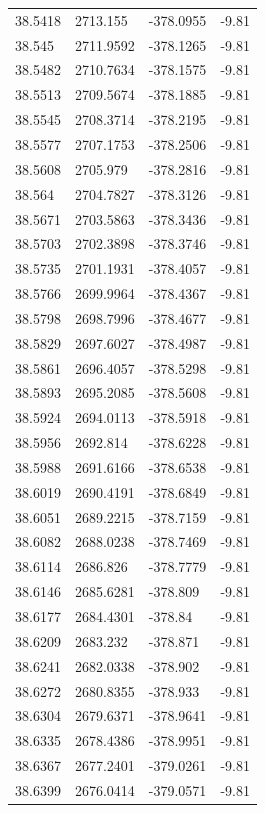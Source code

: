 \begin{table}[H]
\begin{tabular}{llll}
38.5418 & 2713.155 & -378.0955 & -9.81 \\
38.545 & 2711.9592 & -378.1265 & -9.81 \\
38.5482 & 2710.7634 & -378.1575 & -9.81 \\
38.5513 & 2709.5674 & -378.1885 & -9.81 \\
38.5545 & 2708.3714 & -378.2195 & -9.81 \\
38.5577 & 2707.1753 & -378.2506 & -9.81 \\
38.5608 & 2705.979 & -378.2816 & -9.81 \\
38.564 & 2704.7827 & -378.3126 & -9.81 \\
38.5671 & 2703.5863 & -378.3436 & -9.81 \\
38.5703 & 2702.3898 & -378.3746 & -9.81 \\
38.5735 & 2701.1931 & -378.4057 & -9.81 \\
38.5766 & 2699.9964 & -378.4367 & -9.81 \\
38.5798 & 2698.7996 & -378.4677 & -9.81 \\
38.5829 & 2697.6027 & -378.4987 & -9.81 \\
38.5861 & 2696.4057 & -378.5298 & -9.81 \\
38.5893 & 2695.2085 & -378.5608 & -9.81 \\
38.5924 & 2694.0113 & -378.5918 & -9.81 \\
38.5956 & 2692.814 & -378.6228 & -9.81 \\
38.5988 & 2691.6166 & -378.6538 & -9.81 \\
38.6019 & 2690.4191 & -378.6849 & -9.81 \\
38.6051 & 2689.2215 & -378.7159 & -9.81 \\
38.6082 & 2688.0238 & -378.7469 & -9.81 \\
38.6114 & 2686.826 & -378.7779 & -9.81 \\
38.6146 & 2685.6281 & -378.809 & -9.81 \\
38.6177 & 2684.4301 & -378.84 & -9.81 \\
38.6209 & 2683.232 & -378.871 & -9.81 \\
38.6241 & 2682.0338 & -378.902 & -9.81 \\
38.6272 & 2680.8355 & -378.933 & -9.81 \\
38.6304 & 2679.6371 & -378.9641 & -9.81 \\
38.6335 & 2678.4386 & -378.9951 & -9.81 \\
38.6367 & 2677.2401 & -379.0261 & -9.81 \\
38.6399 & 2676.0414 & -379.0571 & -9.81 \\

\end{tabular}
\end{table}
